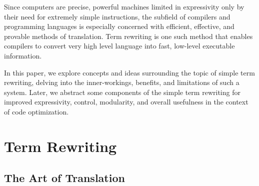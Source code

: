 \documentclass{article}
\begin{document}
Since computers are precise, powerful machines limited in expressivity only by their need for extremely simple instructions,
the subfield of compilers and programming languages is especially concerned with efficient, effective, and provable methods of translation.
Term rewriting is one such method that enables compilers to convert very high level language into fast, low-level executable information.

In this paper, we explore concepts and ideas surrounding the topic of simple term rewriting,
delving into the inner-workings, benefits, and limitations of such a system. Later,
we abstract some components of the simple term rewriting for improved expressivity, control,
modularity, and overall usefulness in the context of code optimization.

\section{Term Rewriting}

\subsection{The Art of Translation}
\end{document}
